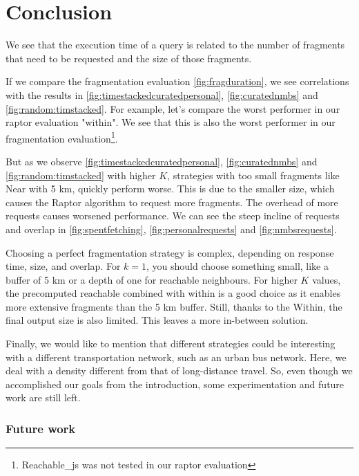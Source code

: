 \chapter*{Conclusion}


We see that the execution time of a query is related to the number of fragments that need to be requested and the size of those fragments.

If we compare the fragmentation evaluation \autoref{fig:fragduration}, we see correlations with the results in \autoref{fig:timestackedcuratedpersonal}, \autoref{fig:curatednmbs} and \autoref{fig:random:timstacked}. For example, let's compare the worst performer in our raptor evaluation "within". We see that this is also the worst performer in our fragmentation evaluation\footnote{Reachable\_js was not tested in our raptor evaluation}.

But as we observe \autoref{fig:timestackedcuratedpersonal}, \autoref{fig:curatednmbs} and \autoref{fig:random:timstacked} with higher $K$, strategies with too small fragments like Near with 5 km, quickly perform worse. This is due to the smaller size, which causes the Raptor algorithm to request more fragments. The overhead of more requests causes worsened performance. We can see the steep incline of requests and overlap in \autoref{fig:spentfetching}, \autoref{fig:personalrequests} and \autoref{fig:nmbsrequests}.

Choosing a perfect fragmentation strategy is complex, depending on response time, size, and overlap. For $k=1$, you should choose something small, like a buffer of 5 km or a depth of one for reachable neighbours. For higher $K$ values, the precomputed reachable combined with within is a good choice as it enables more extensive fragments than the 5 km buffer. Still, thanks to the Within, the final output size is also limited. This leaves a more in-between solution. 

Finally, we would like to mention that different strategies could be interesting with a different transportation network, such as an urban bus network. Here, we deal with a density different from that of long-distance travel. So, even though we accomplished our goals from the introduction, some experimentation and future work are still left.

\subsection*{Future work}

